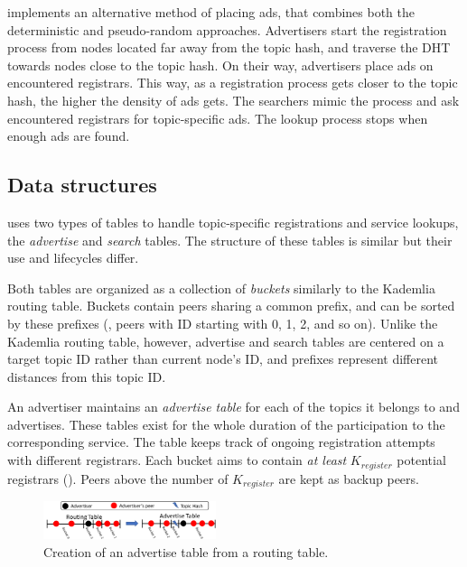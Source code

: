 \sysname implements an alternative method of placing ads, that combines both the deterministic and pseudo-random approaches.
Advertisers start the registration process from nodes located far away from the topic hash, and traverse the DHT towards nodes close to the topic hash.
On their way, advertisers place ads on encountered registrars.
This way, as a registration process gets closer to the topic hash, the higher the density of ads gets.
The searchers mimic the process and ask encountered registrars for topic-specific ads.
The lookup process stops when enough ads are found.

\subsection{Data structures}
\label{sec:struct}

\sysname uses two types of tables to handle topic-specific registrations and service lookups, the \emph{advertise} and \emph{search} tables.
The structure of these tables is similar but their use and lifecycles differ.

Both tables are organized as a collection of \emph{buckets} similarly to the Kademlia routing table.
Buckets contain peers sharing a common prefix, and can be sorted by these prefixes (\eg, peers with ID starting with 0, 1, 2, and so on).
Unlike the Kademlia routing table, however, advertise and search tables are centered on a target topic ID rather than current node's ID, and prefixes represent different distances from this topic ID.

An advertiser maintains an \emph{advertise table} for each of the topics it belongs to and advertises.
These tables exist for the whole duration of the participation to the corresponding service.
The table keeps track of ongoing registration attempts with different registrars.
Each bucket aims to contain \emph{at least} $K_\textit{register}$ potential registrars ().
Peers above the number of $K_\textit{register}$ are kept as backup peers.

\begin{figure}
    \includegraphics[width=0.45\textwidth]{img/tables}
    \vspace{-0.05in}
    \caption{Creation of an advertise table from a routing table.} %
    \label{fig:advertise_table}
    \vspace{-0.15in}
\end{figure}

